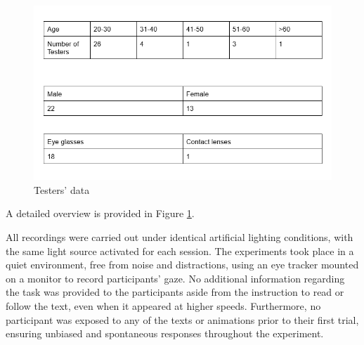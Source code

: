 \documentclass{article}
\begin{document}
\begin{figure}[ht]
    \centering
    \includegraphics[width = 0.6
    \textwidth]{Images/Experiment/tester.png}
    \caption{Testers' data}
    \label{fig:test}
\end{figure}

A detailed overview is provided in Figure \ref{fig:test}.

All recordings were carried out under identical artificial lighting conditions, with the same light source activated for each session.
The experiments took place in a quiet environment, free from noise and distractions, using an eye tracker mounted on a monitor to record participants' gaze. 
No additional information regarding the task was provided to the participants aside from the instruction to read or follow the text, even when it appeared at higher speeds. 
Furthermore, no participant was exposed to any of the texts or animations prior to their first trial, ensuring unbiased and spontaneous responses throughout the experiment.
\end{document}

